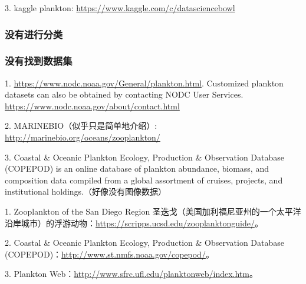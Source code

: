 3. kaggle plankton: \url{https://www.kaggle.com/c/datasciencebowl}

\subsubsection{没有进行分类}

\subsubsection{没有找到数据集}
1. \url{https://www.nodc.noaa.gov/General/plankton.html}. Customized plankton datasets can also be obtained by contacting NODC User Services. \url{https://www.nodc.noaa.gov/about/contact.html}

2. MARINEBIO（似乎只是简单地介绍）: \url{http://marinebio.org/oceans/zooplankton/}

3. Coastal \& Oceanic Plankton Ecology, Production \& Observation Database (COPEPOD) is an online database of plankton abundance, biomass, and composition data compiled from a global assortment of cruises, projects, and institutional holdings.（好像没有图像数据）

{\color{red}1. Zooplankton of the San Diego Region 圣迭戈（美国加利福尼亚州的一个太平洋沿岸城市）的浮游动物：\url{https://scripps.ucsd.edu/zooplanktonguide/}。

2. Coastal \& Oceanic Plankton Ecology, Production \& Observation Database (COPEPOD)：\url{http://www.st.nmfs.noaa.gov/copepod/}。

3. Plankton Web：\url{http://www.sfrc.ufl.edu/planktonweb/index.htm}。
}



















